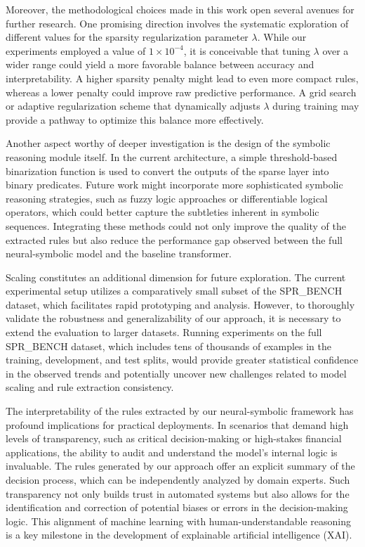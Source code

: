 \documentclass{article}
\begin{document}
Moreover, the methodological choices made in this work open several avenues for further research. One promising direction involves the systematic exploration of different values for the sparsity regularization parameter \(\lambda\). While our experiments employed a value of \(1 \times 10^{-4}\), it is conceivable that tuning \(\lambda\) over a wider range could yield a more favorable balance between accuracy and interpretability. A higher sparsity penalty might lead to even more compact rules, whereas a lower penalty could improve raw predictive performance. A grid search or adaptive regularization scheme that dynamically adjusts \(\lambda\) during training may provide a pathway to optimize this balance more effectively.

Another aspect worthy of deeper investigation is the design of the symbolic reasoning module itself. In the current architecture, a simple threshold-based binarization function is used to convert the outputs of the sparse layer into binary predicates. Future work might incorporate more sophisticated symbolic reasoning strategies, such as fuzzy logic approaches or differentiable logical operators, which could better capture the subtleties inherent in symbolic sequences. Integrating these methods could not only improve the quality of the extracted rules but also reduce the performance gap observed between the full neural-symbolic model and the baseline transformer.

Scaling constitutes an additional dimension for future exploration. The current experimental setup utilizes a comparatively small subset of the SPR\_BENCH dataset, which facilitates rapid prototyping and analysis. However, to thoroughly validate the robustness and generalizability of our approach, it is necessary to extend the evaluation to larger datasets. Running experiments on the full SPR\_BENCH dataset, which includes tens of thousands of examples in the training, development, and test splits, would provide greater statistical confidence in the observed trends and potentially uncover new challenges related to model scaling and rule extraction consistency.

The interpretability of the rules extracted by our neural-symbolic framework has profound implications for practical deployments. In scenarios that demand high levels of transparency, such as critical decision-making or high-stakes financial applications, the ability to audit and understand the model’s internal logic is invaluable. The rules generated by our approach offer an explicit summary of the decision process, which can be independently analyzed by domain experts. Such transparency not only builds trust in automated systems but also allows for the identification and correction of potential biases or errors in the decision-making logic. This alignment of machine learning with human-understandable reasoning is a key milestone in the development of explainable artificial intelligence (XAI).
\end{document}
